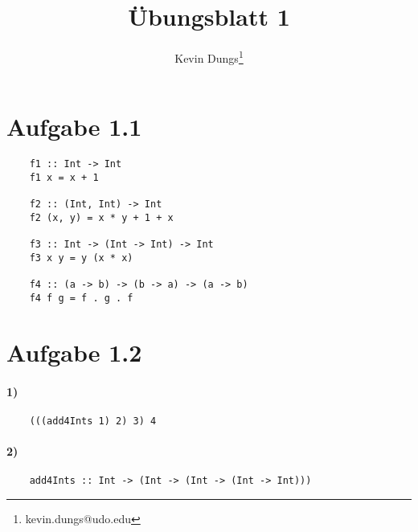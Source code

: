 \documentclass[a4paper]{scrartcl}
\title{Übungsblatt 1}
\author{Kevin Dungs\thanks{kevin.dungs@udo.edu}}
\begin{document}
\maketitle

\section*{Aufgabe 1.1}
\begin{verbatim}
    f1 :: Int -> Int
    f1 x = x + 1
    
    f2 :: (Int, Int) -> Int
    f2 (x, y) = x * y + 1 + x
    
    f3 :: Int -> (Int -> Int) -> Int
    f3 x y = y (x * x)
    
    f4 :: (a -> b) -> (b -> a) -> (a -> b)
    f4 f g = f . g . f
\end{verbatim}

\section*{Aufgabe 1.2}
\paragraph{1)}
\begin{verbatim}
    (((add4Ints 1) 2) 3) 4
\end{verbatim}
\paragraph{2)}
\begin{verbatim}
    add4Ints :: Int -> (Int -> (Int -> (Int -> Int)))
\end{verbatim}
\end{document}
